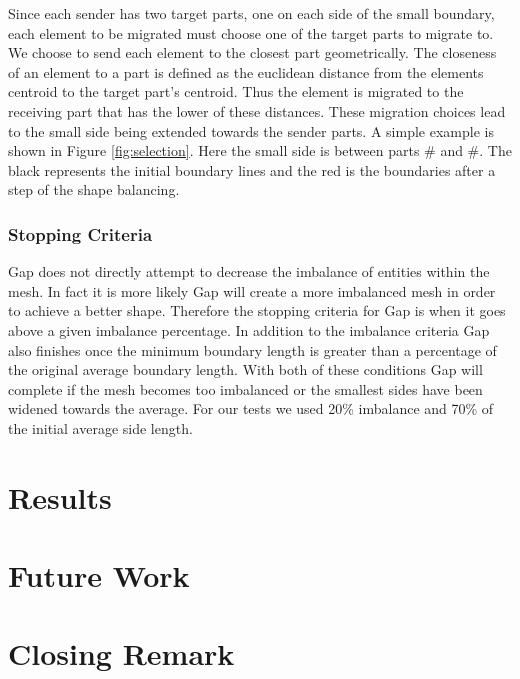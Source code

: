 \documentclass{thesis}
\begin{document}
Since each sender has two target parts, one on each side of the small boundary, each element to be migrated must choose one of the target parts to migrate to. We choose to send each element to the closest part geometrically. The closeness of an element to a part is defined as the euclidean distance from the elements centroid to the target part's centroid. Thus the element is migrated to the receiving part that has the lower of these distances. These migration choices lead to the small side being extended towards the sender parts. A simple example is shown in Figure \ref{fig:selection}. Here the small side is between parts \# and \#. The black represents the initial boundary lines and the red is the boundaries after a step of the shape balancing.

\subsection{Stopping Criteria}
Gap does not directly attempt to decrease the imbalance of entities within 
the mesh. In fact it is more likely Gap will create a more imbalanced mesh 
in order to achieve a better shape. Therefore the stopping criteria for Gap 
is when it goes above a given imbalance percentage. In addition to the 
imbalance criteria Gap also finishes once the minimum boundary length is 
greater than a percentage of the original average boundary length. With both 
of these conditions Gap will complete if the mesh becomes too imbalanced or 
the smallest sides have been widened towards the average. For our tests we 
used 20\% imbalance and 70\% of the initial average side length.

\chapter{Results}

\chapter{Future Work} %





\chapter{Closing Remark}
\end{document}
